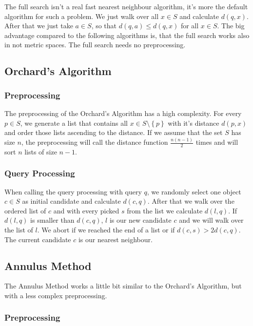 \documentclass[runningheads,a4paper]{llncs}
\begin{document}
The full search isn't a real fast nearest neighbour algorithm, it's more the default algorithm for such a problem. We
just walk over all $x \in S$ and calculate $d(q, x)$. After that we just take $a \in S$, so that
$d(q, a) \le d(q, x)$ for all $x \in S$. The big advantage compared to the following algorithms is, that the full search
works also in not metric spaces. The full search needs no preprocessing.

\subsection{Orchard’s Algorithm}

\subsubsection{Preprocessing}

The preprocessing of the Orchard’s Algorithm has a high complexity. For every $p \in S$, we generate a list that
contains all $x \in S\setminus\left\{ {p}\right\}$ with it's distance $d(p, x)$ and order those lists ascending to the
distance. If we assume that the set $S$ has size $n$, the preprocessing will call the distance function
$\frac{n(n-1)}{2}$ times and will sort $n$ lists of size $n-1$.

\subsubsection{Query Processing}

When calling the query processing with query $q$, we randomly select one object $c \in S$ as initial candidate and
calculate $d(c, q)$. After that we walk over the ordered list of $c$ and with every picked $s$ from the list we
calculate $d(l, q)$. If $d(l, q)$ is smaller than $d(c, q)$, $l$ is our new candidate $c$ and we will walk over the
list of $l$. We abort if we reached the end of a list or if $d(c, s) > 2d(c, q)$. The current candidate $c$ is our
nearest neighbour.

\subsection{Annulus Method}

The Annulus Method works a little bit similar to the Orchard’s Algorithm, but with a less complex preprocessing.

\subsubsection{Preprocessing}
\end{document}
